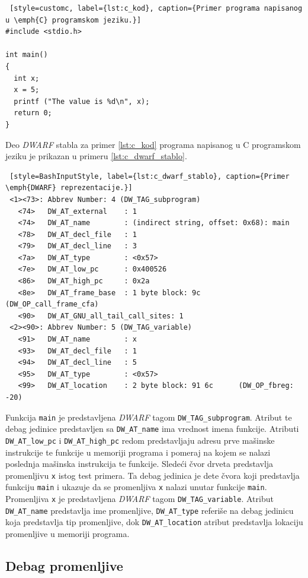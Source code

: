 \documentclass[12pt,oneside]{memoir}
\begin{document}
\begin{lstlisting} [style=customc, label={lst:c_kod}, caption={Primer programa napisanog u \emph{C} programskom jeziku.}]
#include <stdio.h>

int main()
{
  int x;
  x = 5;
  printf ("The value is %d\n", x);
  return 0;
}
\end{lstlisting}

Deo \emph{DWARF} stabla za primer \ref{lst:c_kod} programa napisanog u C programskom jeziku je prikazan u primeru \ref{lst:c_dwarf_stablo}.\newpage

\begin{lstlisting} [style=BashInputStyle, label={lst:c_dwarf_stablo}, caption={Primer \emph{DWARF} reprezentacije.}]
 <1><73>: Abbrev Number: 4 (DW_TAG_subprogram)
   <74>   DW_AT_external    : 1
   <74>   DW_AT_name        : (indirect string, offset: 0x68): main
   <78>   DW_AT_decl_file   : 1
   <79>   DW_AT_decl_line   : 3
   <7a>   DW_AT_type        : <0x57>
   <7e>   DW_AT_low_pc      : 0x400526
   <86>   DW_AT_high_pc     : 0x2a
   <8e>   DW_AT_frame_base  : 1 byte block: 9c         (DW_OP_call_frame_cfa)
   <90>   DW_AT_GNU_all_tail_call_sites: 1
 <2><90>: Abbrev Number: 5 (DW_TAG_variable)
   <91>   DW_AT_name        : x
   <93>   DW_AT_decl_file   : 1
   <94>   DW_AT_decl_line   : 5
   <95>   DW_AT_type        : <0x57>
   <99>   DW_AT_location    : 2 byte block: 91 6c      (DW_OP_fbreg: -20)
\end{lstlisting}

Funkcija \texttt{main} je predstavljena \emph{DWARF} tagom \texttt{DW\_TAG\_subprogram}. Atribut te debag jedinice predstavljen sa \texttt{DW\_AT\_name} ima vrednost imena funkcije. Atributi \texttt{DW\_AT\_low\_pc} i \texttt{DW\_AT\_high\_pc} redom predstavljaju adresu prve mašinske instrukcije te funkcije u memoriji programa i pomeraj na kojem se nalazi poslednja mašinska instrukcija te funkcije. Sledeći čvor drveta predstavlja promenljivu \texttt{x} istog test primera. Ta debag jedinica je dete čvora koji predstavlja funkciju \texttt{main} i ukazuje da se promenljiva \texttt{x} nalazi unutar funkcije \texttt{main}. Promenljiva \texttt{x} je predstavljena \emph{DWARF} tagom \texttt{DW\_TAG\_variable}. Atribut \texttt{DW\_AT\_name} predstavlja ime promenljive, \texttt{DW\_AT\_type} referiše na debag jedinicu koja predstavlja tip promenljive, dok \texttt{DW\_AT\_location} atribut predstavlja lokaciju promenljive u memoriji programa. 

\subsection{Debag promenljive}
\end{document}
